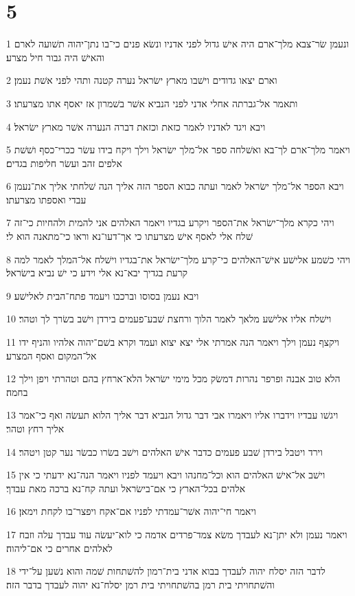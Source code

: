 \chapter{5}

\par 1 ונעמן שׂר־צבא מלך־ארם היה אישׁ גדול לפני אדניו ונשׂא פנים כי־בו נתן־יהוה תשׁועה לארם והאישׁ היה גבור חיל מצרע׃
\par 2 וארם יצאו גדודים וישׁבו מארץ ישׂראל נערה קטנה ותהי לפני אשׁת נעמן׃
\par 3 ותאמר אל־גברתה אחלי אדני לפני הנביא אשׁר בשׁמרון אז יאסף אתו מצרעתו׃
\par 4 ויבא ויגד לאדניו לאמר כזאת וכזאת דברה הנערה אשׁר מארץ ישׂראל׃
\par 5 ויאמר מלך־ארם לך־בא ואשׁלחה ספר אל־מלך ישׂראל וילך ויקח בידו עשׂר ככרי־כסף ושׁשׁת אלפים זהב ועשׂר חליפות בגדים׃
\par 6 ויבא הספר אל־מלך ישׂראל לאמר ועתה כבוא הספר הזה אליך הנה שׁלחתי אליך את־נעמן עבדי ואספתו מצרעתו׃
\par 7 ויהי כקרא מלך־ישׂראל את־הספר ויקרע בגדיו ויאמר האלהים אני להמית ולהחיות כי־זה שׁלח אלי לאסף אישׁ מצרעתו כי אך־דעו־נא וראו כי־מתאנה הוא לי׃
\par 8 ויהי כשׁמע אלישׁע אישׁ־האלהים כי־קרע מלך־ישׂראל את־בגדיו וישׁלח אל־המלך לאמר למה קרעת בגדיך יבא־נא אלי וידע כי ישׁ נביא בישׂראל׃
\par 9 ויבא נעמן בסוסו וברכבו ויעמד פתח־הבית לאלישׁע׃
\par 10 וישׁלח אליו אלישׁע מלאך לאמר הלוך ורחצת שׁבע־פעמים בירדן וישׁב בשׂרך לך וטהר׃
\par 11 ויקצף נעמן וילך ויאמר הנה אמרתי אלי יצא יצוא ועמד וקרא בשׁם־יהוה אלהיו והניף ידו אל־המקום ואסף המצרע׃
\par 12 הלא טוב אבנה ופרפר נהרות דמשׂק מכל מימי ישׂראל הלא־ארחץ בהם וטהרתי ויפן וילך בחמה׃
\par 13 ויגשׁו עבדיו וידברו אליו ויאמרו אבי דבר גדול הנביא דבר אליך הלוא תעשׂה ואף כי־אמר אליך רחץ וטהר׃
\par 14 וירד ויטבל בירדן שׁבע פעמים כדבר אישׁ האלהים וישׁב בשׂרו כבשׂר נער קטן ויטהר׃
\par 15 וישׁב אל־אישׁ האלהים הוא וכל־מחנהו ויבא ויעמד לפניו ויאמר הנה־נא ידעתי כי אין אלהים בכל־הארץ כי אם־בישׂראל ועתה קח־נא ברכה מאת עבדך׃
\par 16 ויאמר חי־יהוה אשׁר־עמדתי לפניו אם־אקח ויפצר־בו לקחת וימאן׃
\par 17 ויאמר נעמן ולא יתן־נא לעבדך משׂא צמד־פרדים אדמה כי לוא־יעשׂה עוד עבדך עלה וזבח לאלהים אחרים כי אם־ליהוה׃
\par 18 לדבר הזה יסלח יהוה לעבדך בבוא אדני בית־רמון להשׁתחות שׁמה והוא נשׁען על־ידי והשׁתחויתי בית רמן בהשׁתחויתי בית רמן יסלח־נא יהוה לעבדך בדבר הזה׃
